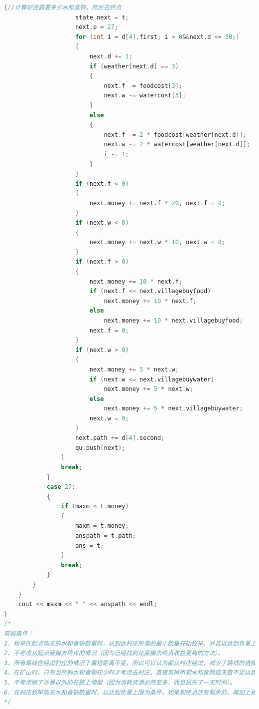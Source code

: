 \documentclass[withoutpreface,bwprint]{cumcmthesis} %
\begin{document}
\begin{appendices}
\begin{lstlisting}[language=c++]
                {//计算好还需要多少水和食物，然后去终点
                    state next = t;
                    next.p = 27;
                    for (int i = d[4].first; i > 0&&next.d <= 30;)
                    {
                        next.d += 1;
                        if (weather[next.d] == 3)
                        {
                            next.f -= foodcost[3];
                            next.w -= watercost[3];
                        }
                        else
                        {
                            next.f -= 2 * foodcost[weather[next.d]];
                            next.w -= 2 * watercost[weather[next.d]];
                            i -= 1;
                        }
                    }
                    if (next.f < 0)
                    {
                        next.money += next.f * 20, next.f = 0;
                    }
                    if (next.w < 0)
                    {
                        next.money += next.w * 10, next.w = 0;
                    }
                    if (next.f > 0)
                    {
                        next.money += 10 * next.f;
                        if (next.f <= next.villagebuyfood)
                            next.money += 10 * next.f;
                        else
                            next.money += 10 * next.villagebuyfood;
                        next.f = 0;
                    }
                    if (next.w > 0)
                    {
                        next.money += 5 * next.w;
                        if (next.w <= next.villagebuywater)
                            next.money += 5 * next.w;
                        else
                            next.money += 5 * next.villagebuywater;
                        next.w = 0;
                    }
                    next.path += d[4].second;
                    qu.push(next);
                }
                break;
            }
            case 27:
            {
                if (maxm < t.money)
                {
                    maxm = t.money;
                    anspath = t.path;
                    ans = t;
                }
                break;
            }
        }
    }
    cout << maxm << " " << anspath << endl;
}
/*
剪枝条件：
1、枚举在起点购买的水和食物数量时，从到达村庄所需的最小数量开始枚举，并且以达到负重上限为条件（这是因为起点的水和食物价格较便宜）。
2、不考虑从起点直接去终点的情况（因为已经找到比直接去终点收益更高的方法）。
3、所有路线在经过村庄的情况下最短距离不变，所以可以认为都从村庄经过，减少了路线的选择。
4、在矿山时，只有当所剩水和食物较少时才考虑去村庄。直接剪掉所剩水和食物或天数不足以到达村庄或终点的情况。
5、不考虑除了沙暴以外的在路上停留（因为消耗资源必然变多，而且损失了一天时间）。
6、在村庄枚举购买水和食物数量时，以达到负重上限为条件。如果到终点还有剩余的，再加上相应的钱数（可以视作原来在村庄少买了一些）。
*/


\end{lstlisting}
\end{appendices}
\end{document}
